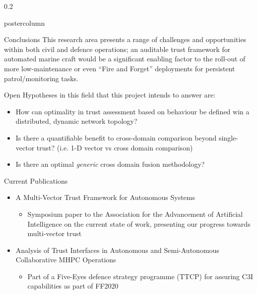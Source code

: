 \documentclass[final,hyperref={pdfpagelabels=false}]{beamer}
\def\colwidth{0.2\linewidth}
\begin{document}
\begin{frame}[fragile]
\begin{columns}[T]
\begin{column}{\colwidth}
\begin{beamercolorbox}[center,wd=\textwidth]{postercolumn}
\begin{minipage}[T]{.98\textwidth}
{            \begin{block}{Conclusions}
              This research area presents a range of challenges and opportunities within both civil and defence operations; an auditable trust framework for automated marine craft would be a significant enabling factor to the roll-out of more low-maintenance or even ``Fire and Forget'' deployments for persistent patrol/monitoring tasks. 

              \vspace{0.3\baselineskip}

              Open Hypotheses in this field that this project intends to answer are:
              \begin{itemize}
                \item How can optimality in trust assessment based on behaviour be defined win a distributed, dynamic network topology?
                \item Is there a quantifiable benefit to cross-domain comparison beyond single-vector trust? (i.e. 1-D vector vs cross domain comparison)
                \item Is there an optimal \emph{generic} cross domain fusion methodology?
              \end{itemize}
            \end{block}
          \begin{block}{Current Publications}
            \begin{itemize}
              \item A Multi-Vector Trust Framework for Autonomous Systems \cite{Bolster2014}
                \begin{itemize}
                  \item Symposium paper to the Association for the Advancement of Artificial Intelligence on the current state of work, presenting our progress towards multi-vector trust
                \end{itemize}


              \item Analysis of Trust Interfaces in Autonomous and Semi-Autonomous Collaborative MHPC Operations \cite{Bolster2014a}
                \begin{itemize}
                  \item Part of a Five-Eyes defence strategy programme (TTCP) for assuring C3I capabilities as part of FF2020
                \end{itemize}


\end{itemize}
\end{block}}
\end{minipage}
\end{beamercolorbox}
\end{column}
\end{columns}
\end{frame}
\end{document}

